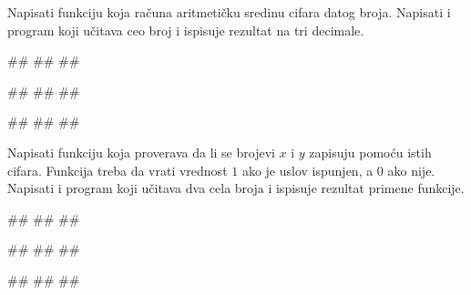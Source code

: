 \begin{Exercise}[label=p1.4_11] 
Napisati funkciju  koja
računa aritmetičku sredinu cifara datog broja. Napisati i program koji
učitava ceo broj i ispisuje rezultat na tri decimale.
 
\begin{miditest}
\begin{upotreba}{1}
#\naslovInt#
##
##
\end{upotreba}
\end{miditest}
\begin{miditest}
\begin{upotreba}{2}
#\naslovInt#
##
##
\end{upotreba}
\end{miditest}

\begin{miditest}
\begin{upotreba}{3}
#\naslovInt#
##
##
\end{upotreba}
\end{miditest}

\end{Exercise}
\begin{Answer}[ref=p1.4_11]
\end{Answer}


\begin{Exercise}[label=p1.4_12] 
Napisati funkciju  koja proverava da li
se brojevi $x$ i $y$ zapisuju pomoću istih cifara. Funkcija treba da
vrati vrednost $1$ ako je uslov ispunjen, a $0$ ako nije. Napisati i
program koji učitava dva cela broja i ispisuje rezultat primene
funkcije.
 
\begin{miditest}
\begin{upotreba}{1}
#\naslovInt#
##
##
\end{upotreba}
\end{miditest}
\begin{miditest}
\begin{upotreba}{2}
#\naslovInt#
##
##
\end{upotreba}
\end{miditest}

\begin{miditest}
\begin{upotreba}{3}
#\naslovInt#
##
##
\end{upotreba}
\end{miditest} 

\end{Exercise}
\begin{Answer}[ref=p1.4_12]
\end{Answer}

